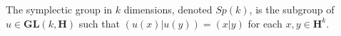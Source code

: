 The symplectic group in $k$ dimensions, denoted $Sp(k)$, is the subgroup of $u \in \mathbf{GL}(k, \mathbf{H})$ such that $(u(x)|u(y)) = (x|y)$ for each $x, y \in \mathbf{H}^k$.
